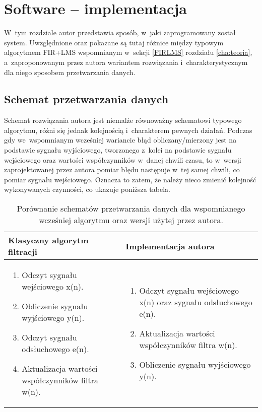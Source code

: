 \chapter{Software -- implementacja}
\label{cha:software}
W~tym rozdziale autor przedstawia sposób, w~jaki zaprogramowany został system. Uwzględnione oraz pokazane są tutaj różnice między typowym algorytmem FIR+LMS wspomnianym w~sekcji \ref{FIRLMS} rozdziału \ref{cha:teoria}, a~zaproponowanym przez autora wariantem rozwiązania i~charakterystycznym dla niego sposobem przetwarzania danych.
 
\section{Schemat przetwarzania danych}
Schemat rozwiązania autora jest niemalże równoważny schematowi typowego algorytmu, różni się jednak kolejnością i~charakterem pewnych działań. Podczas gdy we~wspomnianym wcześniej wariancie błąd obliczany/mierzony jest na podstawie sygnału wyjściowego, tworzonego z~kolei na podstawie sygnału wejściowego oraz wartości współczynników w~danej chwili czasu, to w~wersji zaprojektowanej przez autora pomiar błędu następuje w~tej samej chwili, co pomiar sygnału wejściowego. Oznacza to zatem, że należy nieco zmienić kolejność wykonywanych czynności, co ukazuje poniższa tabela.
\begin{table}[h]
	\centering
	\caption{Porównanie schematów przetwarzania danych dla wspomnianego wcześniej algorytmu oraz wersji użytej przez autora.}
	\begin{tabular}{|p{}|p{}|}
		\toprule Klasyczny algorytm filtracji & Implementacja autora \\ \midrule
		\begin{enumerate}	
			\item Odczyt sygnału wejściowego x(n).
			\item Obliczenie sygnału wyjściowego y(n).
			\item Odczyt sygnału odsłuchowego e(n).
			\item Aktualizacja wartości współczynników filtra w(n).
		\end{enumerate} & 
		\begin{enumerate}	
			\item Odczyt sygnału wejściowego x(n) oraz sygnału odsłuchowego e(n).
			\item Aktualizacja wartości współczynników filtra w(n).
			\item Obliczenie sygnału wyjściowego y(n).
		\end{enumerate}\\ \bottomrule
	\end{tabular}
\end{table}

